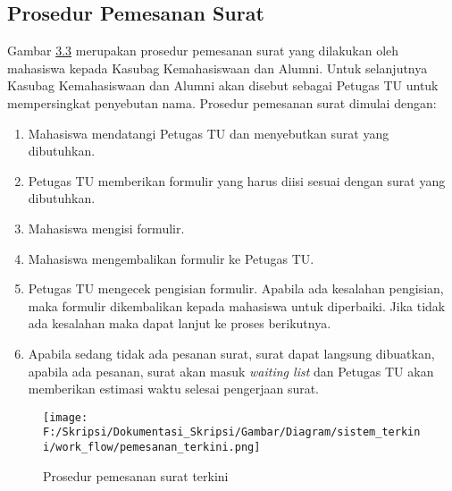 \subsection{Prosedur Pemesanan Surat}
\label{sec:prosedur_pemesanan_surat}
Gambar \hyperlink{pemesanan_terkini}{3.3} merupakan prosedur pemesanan surat yang dilakukan oleh mahasiswa kepada Kasubag Kemahasiswaan dan Alumni. Untuk selanjutnya Kasubag Kemahasiswaan dan Alumni akan disebut sebagai Petugas TU untuk mempersingkat penyebutan nama. Prosedur pemesanan surat dimulai dengan:
\begin{enumerate}
	\item Mahasiswa mendatangi Petugas TU dan menyebutkan surat yang dibutuhkan.
	\item Petugas TU memberikan formulir yang harus diisi sesuai dengan surat yang dibutuhkan.
	\item Mahasiswa mengisi formulir.
	\item Mahasiswa mengembalikan formulir ke Petugas TU.
	\item Petugas TU mengecek pengisian formulir. Apabila ada kesalahan pengisian, maka formulir dikembalikan kepada mahasiswa untuk diperbaiki. Jika tidak ada kesalahan maka dapat lanjut ke proses berikutnya.
	\item Apabila sedang tidak ada pesanan surat, surat dapat langsung dibuatkan, apabila ada pesanan, surat akan masuk \textit{waiting list} dan Petugas TU akan memberikan estimasi waktu selesai pengerjaan surat.
\end{enumerate}

\begin{figure}[H]
	\centering
		\texttt{[image: F:/Skripsi/Dokumentasi\_Skripsi/Gambar/Diagram/sistem\_terkini/work\_flow/pemesanan\_terkini.png]}
	{\caption{Prosedur pemesanan surat terkini}}
	\label{fig:pemesanan_terkini}
\end{figure}

